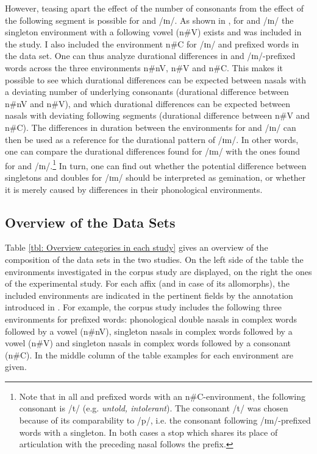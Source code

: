 However, teasing apart the effect of the number of consonants from the effect of the following segment is possible for  and /ɪn/. As shown in , for  and /ɪn/ the singleton environment with a following vowel (n\#V) exists and was included in the study. I also included the environment n\#C for /ɪn/ and prefixed words in the data set.
 One can thus analyze durational differences in  and /ɪn/-prefixed words across the three environments  n\#nV, n\#V and n\#C. 
This makes it possible to see which durational differences can be expected between nasals with a deviating number of underlying consonants (durational difference between n\#nV and n\#V), and which durational differences can be expected between nasals with deviating following segments (durational difference between n\#V and n\#C). 
The differences in duration between the environments for  and /ɪn/ can then be used as a reference for the durational pattern of /ɪm/. 
In other words, one can compare the durational differences found for /ɪm/ with the ones found for  and /ɪn/.\footnote{Note that in all  and prefixed words with an n\#C-environment, the following consonant is /t/ (e.g. \textit{untold, intolerant}). The consonant /t/ was chosen because of its comparability to /p/, i.e. the consonant following /ɪm/-prefixed words with a singleton. In both cases a stop which shares its place of articulation with the preceding nasal follows the prefix.}
In turn, one can find out whether the potential difference between singletons and doubles for /ɪm/ should be interpreted as gemination, or whether it is merely caused by differences in their phonological environments.





\subsection{Overview of the Data Sets}

Table \ref{tbl: Overview categories in each study} gives an overview of the composition of the data sets in the two studies.
On the left side of the table the environments investigated in the corpus study are displayed, on the right the ones of the experimental study. 
For each affix (and in case of  its allomorphs), the included environments are indicated in the pertinent fields by the annotation introduced in .
For example, the corpus study includes the following three environments for prefixed words: phonological double nasals in complex words followed by a vowel (n\#nV), singleton nasals in complex words followed by a vowel (n\#V) and singleton nasals in complex words followed by a consonant (n\#C). In the middle column of the table examples for each environment are given.


